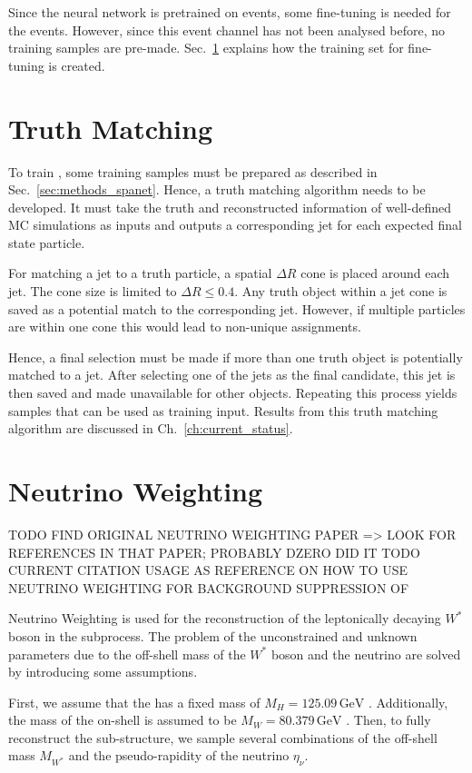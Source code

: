 \documentclass[bachelor,ngerman,english]{GAUBM}
\begin{document}
Since the neural network is pretrained on \ttbar events, some fine-tuning is needed for the \ttHWW events. However, since this event channel has not been analysed before, no training samples are pre-made. Sec.~\ref{sec:methods_truth_matching} explains how the \ttHWW training set for fine-tuning is created.


\section{Truth Matching}
\label{sec:methods_truth_matching}
To train \spanet, some training samples must be prepared as described in Sec.~\ref{sec:methods_spanet}. Hence, a truth matching algorithm needs to be developed. It must take the truth and reconstructed information of well-defined MC simulations as inputs and outputs a corresponding jet for each expected final state particle.

For matching a jet to a truth particle, a spatial $\Delta R$ cone is placed around each jet. The cone size is limited to $\Delta R\leq0.4$. Any truth object within a jet cone is saved as a potential match to the corresponding jet. However, if multiple particles are within one cone this would lead to non-unique assignments. 

Hence, a final selection must be made if more than one truth object is potentially matched to a jet. After selecting one of the jets as the final candidate, this jet is then saved and made unavailable for other objects. Repeating this process yields samples that can be used as \spanet training input. Results from this truth matching algorithm are discussed in Ch.~\ref{ch:current_status}.


\section{Neutrino Weighting}
\label{sec:methods_neutrino_weighting}
TODO FIND ORIGINAL NEUTRINO WEIGHTING PAPER => LOOK FOR REFERENCES IN THAT PAPER; PROBABLY DZERO DID IT
TODO CURRENT CITATION USAGE AS REFERENCE ON HOW TO USE NEUTRINO WEIGHTING FOR BACKGROUND SUPPRESSION OF 

Neutrino Weighting \cite{neutrino_weighting} is used for the reconstruction of the leptonically decaying $W^*$ boson in the \HWW subprocess. The problem of the unconstrained and unknown parameters due to the off-shell mass of the $W^*$ boson and the neutrino are solved by introducing some assumptions. 

First, we assume that the \Hboson has a fixed mass of $M_H=125.09\,\text{GeV}$ \cite{pdg}. Additionally, the mass of the on-shell \wboson is assumed to be $M_W=80.379\,\text{GeV}$ \cite{pdg}. Then, to fully reconstruct the \HWW sub-structure, we sample several combinations of the off-shell mass $M_{W^*}$ and the pseudo-rapidity of the neutrino $\eta_\nu$. 
\end{document}

